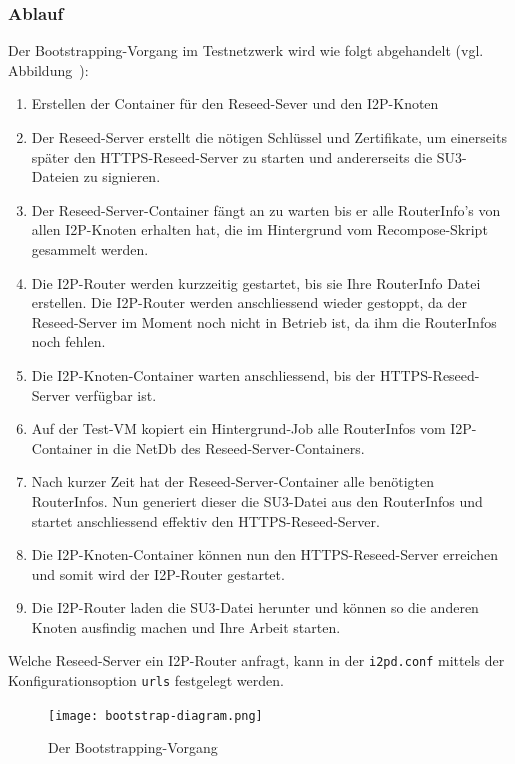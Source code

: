 \subsubsection{Ablauf}

Der Bootstrapping-Vorgang im Testnetzwerk wird wie folgt abgehandelt (vgl. Abbildung~):

\begin{enumerate}
    \item Erstellen der Container für den Reseed-Sever und den I2P-Knoten
    \item Der Reseed-Server erstellt die nötigen Schlüssel und Zertifikate, um einerseits später den HTTPS-Reseed-Server zu starten und andererseits die SU3-Dateien zu signieren.
    \item Der Reseed-Server-Container fängt an zu warten bis er alle RouterInfo's von allen I2P-Knoten erhalten hat, die im Hintergrund vom Recompose-Skript gesammelt werden.
    \item Die I2P-Router werden kurzzeitig gestartet, bis sie Ihre RouterInfo Datei erstellen. Die I2P-Router werden anschliessend wieder gestoppt, da der Reseed-Server im Moment noch nicht in Betrieb ist, da ihm die RouterInfos noch fehlen.
    \item Die I2P-Knoten-Container warten anschliessend, bis der HTTPS-Reseed-Server verfügbar ist.
    \item Auf der Test-VM kopiert ein Hintergrund-Job alle RouterInfos vom I2P-Container in die NetDb des Reseed-Server-Containers.
    \item Nach kurzer Zeit hat der Reseed-Server-Container alle benötigten RouterInfos. Nun generiert dieser die SU3-Datei aus den RouterInfos und startet anschliessend effektiv den HTTPS-Reseed-Server.
    \item Die I2P-Knoten-Container können nun den HTTPS-Reseed-Server erreichen und somit wird der I2P-Router gestartet.
    \item Die I2P-Router laden die SU3-Datei herunter und können so die anderen Knoten ausfindig machen und Ihre Arbeit starten.
\end{enumerate}

Welche Reseed-Server ein I2P-Router anfragt, kann in der \lstinline|i2pd.conf| mittels der Konfigurationsoption \lstinline|urls| festgelegt werden.

\begin{landscape}%
\begin{figure}[ht]
  \texttt{[image: bootstrap-diagram.png]}
  \caption{Der Bootstrapping-Vorgang}\label{fig:bootstrap-diagram}
\end{figure}
\end{landscape}%

